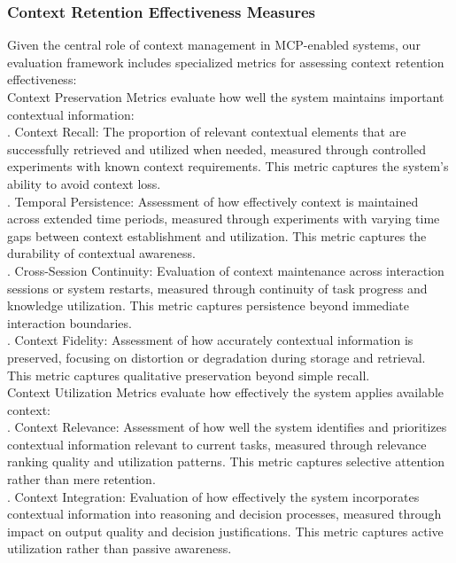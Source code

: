 \subsubsection{Context Retention Effectiveness Measures}
Given the central role of context management in MCP-enabled systems, our evaluation framework includes specialized metrics for assessing context retention effectiveness:\\ \newline
Context Preservation Metrics evaluate how well the system maintains important contextual information:\\ . Context Recall: The proportion of relevant contextual elements that are successfully retrieved and utilized when needed, measured through controlled experiments with known context requirements. This metric captures the system's ability to avoid context loss.\\ . Temporal Persistence: Assessment of how effectively context is maintained across extended time periods, measured through experiments with varying time gaps between context establishment and utilization. This metric captures the durability of contextual awareness.\\ . Cross-Session Continuity: Evaluation of context maintenance across interaction sessions or system restarts, measured through continuity of task progress and knowledge utilization. This metric captures persistence beyond immediate interaction boundaries.\\ . Context Fidelity: Assessment of how accurately contextual information is preserved, focusing on distortion or degradation during storage and retrieval. This metric captures qualitative preservation beyond simple recall.\\ \newline
Context Utilization Metrics evaluate how effectively the system applies available context:\\ . Context Relevance: Assessment of how well the system identifies and prioritizes contextual information relevant to current tasks, measured through relevance ranking quality and utilization patterns. This metric captures selective attention rather than mere retention.\\ . Context Integration: Evaluation of how effectively the system incorporates contextual information into reasoning and decision processes, measured through impact on output quality and decision justifications. This metric captures active utilization rather than passive awareness.\\ \newline
